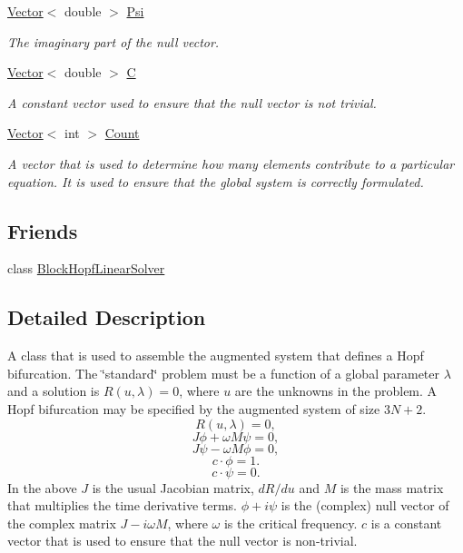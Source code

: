 \begin{DoxyCompactItemize}
\hyperlink{classoomph_1_1Vector}{Vector}$<$ double $>$ \hyperlink{classoomph_1_1HopfHandler_a9f4d4f9e8962f1cd666df8de85a37d2a}{Psi}
\begin{DoxyCompactList}\small\item\em The imaginary part of the null vector. \end{DoxyCompactList}\item 
\hyperlink{classoomph_1_1Vector}{Vector}$<$ double $>$ \hyperlink{classoomph_1_1HopfHandler_a99aabcf5ac54311f1f7acb0dbd431b84}{C}
\begin{DoxyCompactList}\small\item\em A constant vector used to ensure that the null vector is not trivial. \end{DoxyCompactList}\item 
\hyperlink{classoomph_1_1Vector}{Vector}$<$ int $>$ \hyperlink{classoomph_1_1HopfHandler_a1b429a8220b316a487998cae04f46ec7}{Count}
\begin{DoxyCompactList}\small\item\em A vector that is used to determine how many elements contribute to a particular equation. It is used to ensure that the global system is correctly formulated. \end{DoxyCompactList}\end{DoxyCompactItemize}
\subsection*{Friends}
\begin{DoxyCompactItemize}
\item 
class \hyperlink{classoomph_1_1HopfHandler_a199677d64d3b2f908690d10a2398b737}{Block\+Hopf\+Linear\+Solver}
\end{DoxyCompactItemize}


\subsection{Detailed Description}
A class that is used to assemble the augmented system that defines a Hopf bifurcation. The \char`\"{}standard\char`\"{} problem must be a function of a global parameter $ \lambda $ and a solution is $ R(u,\lambda) = 0 $, where $ u $ are the unknowns in the problem. A Hopf bifurcation may be specified by the augmented system of size $ 3N+2 $. \[ R(u,\lambda) = 0, \] \[ J\phi + \omega M \psi = 0, \] \[ J\psi - \omega M \phi = 0, \] \[ c \cdot \phi = 1. \] \[ c \cdot \psi = 0. \] In the above $ J $ is the usual Jacobian matrix, $ dR/du $ and $ M $ is the mass matrix that multiplies the time derivative terms. $ \phi + i\psi $ is the (complex) null vector of the complex matrix $ J - i\omega M $, where $ \omega $ is the critical frequency. $ c $ is a constant vector that is used to ensure that the null vector is non-\/trivial. 

